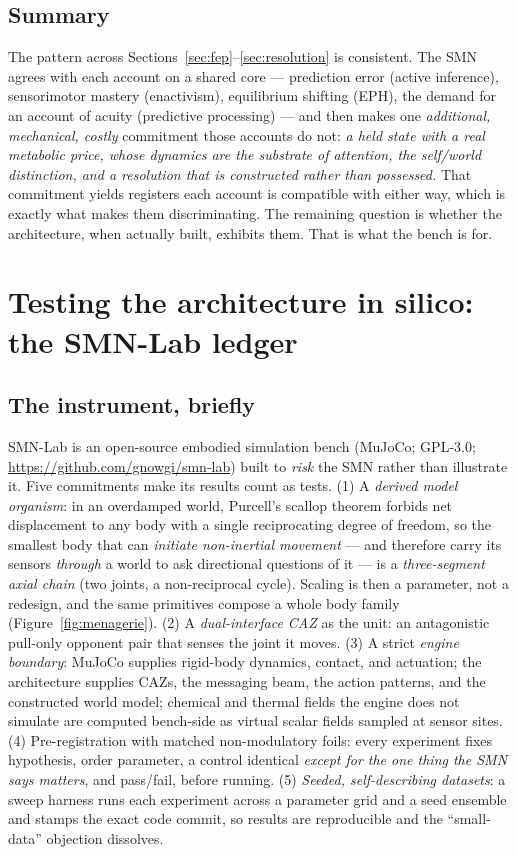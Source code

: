 \documentclass[utf8]{FrontiersinHarvard} %
\begin{document}
\subsection{Summary}\label{sec:falsify-summary}
The pattern across Sections~\ref{sec:fep}--\ref{sec:resolution} is consistent. The SMN agrees with each account on a shared core --- prediction error (active inference), sensorimotor mastery (enactivism), equilibrium shifting (EPH), the demand for an account of acuity (predictive processing) --- and then makes one \emph{additional, mechanical, costly} commitment those accounts do not: \emph{a held state with a real metabolic price, whose dynamics are the substrate of attention, the self/world distinction, and a resolution that is constructed rather than possessed.} That commitment yields registers each account is compatible with either way, which is exactly what makes them discriminating. The remaining question is whether the architecture, when actually built, exhibits them. That is what the bench is for.

\section{Testing the architecture in silico: the SMN-Lab ledger}\label{sec:ledger}

\subsection{The instrument, briefly}\label{sec:instrument}
SMN-Lab is an open-source embodied simulation bench (MuJoCo; GPL-3.0; \url{https://github.com/gnowgi/smn-lab}) built to \emph{risk} the SMN rather than illustrate it. Five commitments make its results count as tests. (1) A \emph{derived model organism}: in an overdamped world, Purcell's scallop theorem \citep{Purcell1977LowRe} forbids net displacement to any body with a single reciprocating degree of freedom, so the smallest body that can \emph{initiate non-inertial movement} --- and therefore carry its sensors \emph{through} a world to ask directional questions of it --- is a \emph{three-segment axial chain} (two joints, a non-reciprocal cycle). Scaling is then a parameter, not a redesign, and the same primitives compose a whole body family (Figure~\ref{fig:menagerie}). (2) A \emph{dual-interface CAZ} as the unit: an antagonistic pull-only opponent pair that senses the joint it moves. (3) A strict \emph{engine boundary}: MuJoCo supplies rigid-body dynamics, contact, and actuation; the architecture supplies CAZs, the messaging beam, the action patterns, and the constructed world model; chemical and thermal fields the engine does not simulate are computed bench-side as virtual scalar fields sampled at sensor sites. (4) Pre-registration with matched non-modulatory foils: every experiment fixes hypothesis, order parameter, a control identical \emph{except for the one thing the SMN says matters}, and pass/fail, before running. (5) \emph{Seeded, self-describing datasets}: a sweep harness runs each experiment across a parameter grid and a seed ensemble and stamps the exact code commit, so results are reproducible and the ``small-data'' objection dissolves.
\end{document}

